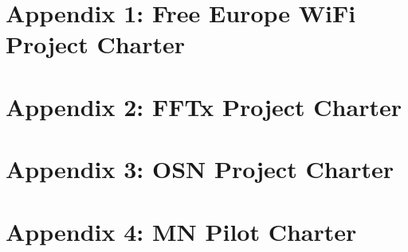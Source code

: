 \documentclass[draftclsnofoot,12pt,journal,onecolumn]{IEEEtran}
\begin{document}


% 








\appendices

\section{Appendix 1: Free Europe WiFi Project Charter}



\section{Appendix 2: FFTx Project Charter}


\section{Appendix 3: OSN Project Charter}


\section{Appendix 4: MN Pilot Charter}


\end{document}
